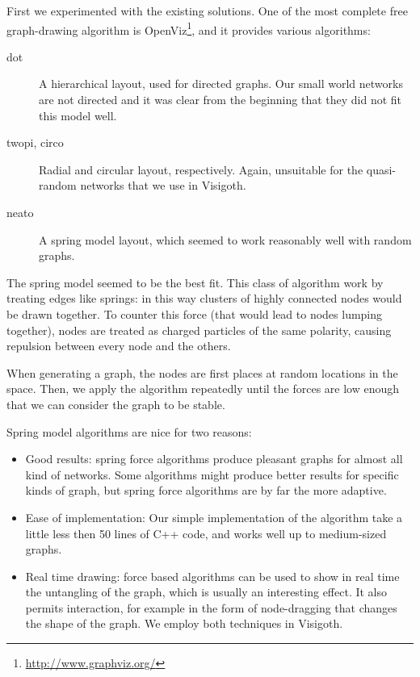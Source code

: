 \documentclass[a4paper,11pt,titlepage]{article}
\begin{document}
First we experimented with the existing solutions. One of the most
complete free graph-drawing algorithm is
OpenViz\footnote{\url{http://www.graphviz.org/}}, and it provides
various algorithms:

\begin{description}
\item [dot] A hierarchical layout, used for directed graphs. Our small
  world networks are not directed and it was clear from the beginning
  that they did not fit this model well.

\item [twopi, circo] Radial and circular layout, respectively. Again,
  unsuitable for the quasi-random networks that we use in Visigoth.

\item [neato] A spring model layout, which seemed to work reasonably
  well with random graphs.
\end{description}

The spring model seemed to be the best fit. This class of algorithm
work by treating edges like springs: in this way clusters of highly
connected nodes would be drawn together. To counter this force (that
would lead to nodes lumping together), nodes are treated as charged
particles of the same polarity, causing repulsion between every node
and the others.

When generating a graph, the nodes are first places at random
locations in the space. Then, we apply the algorithm repeatedly until
the forces are low enough that we can consider the graph to be stable.

Spring model algorithms are nice for two reasons:

\begin{itemize}
\item Good results: spring force algorithms produce pleasant graphs
  for almost all kind of networks. Some algorithms might produce
  better results for specific kinds of graph, but spring force
  algorithms are by far the more adaptive.

\item Ease of implementation: Our simple implementation of the
  algorithm take a little less then 50 lines of C++ code, and works
  well up to medium-sized graphs.

\item Real time drawing: force based algorithms can be used to show in
  real time the untangling of the graph, which is usually an
  interesting effect. It also permits interaction, for example in the
  form of node-dragging that changes the shape of the graph. We employ
  both techniques in Visigoth.
\end{itemize}
\end{document}
